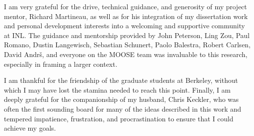 \documentclass{ucbthesis}
\begin{document}
\begin{frontmatter}
\begin{acknowledgements}
I am very grateful for the drive, technical guidance, and generosity of my project mentor, Richard Martineau, as well as for his integration of my dissertation work and personal development interests into a welcoming and supportive community at INL. The guidance and mentorship provided by John Peterson, Ling Zou, Paul Romano, Dustin Langewisch, Sebastian Schunert, Paolo Balestra, Robert Carlsen, David Andr\v{s}, and everyone on the MOOSE team was invaluable to this research, especially in framing a larger context. 

I am thankful for the friendship of the graduate students at Berkeley, without which I may have lost the stamina needed to reach this point. Finally, I am deeply grateful for the companionship of my husband, Chris Keckler, who was often the first sounding board for many of the ideas described in this work and tempered impatience, frustration, and procrastination to ensure that I could achieve my goals.

\end{acknowledgements}

\end{frontmatter}

\pagestyle{headings}

















\clearpage

\printbibliography
\end{document}
